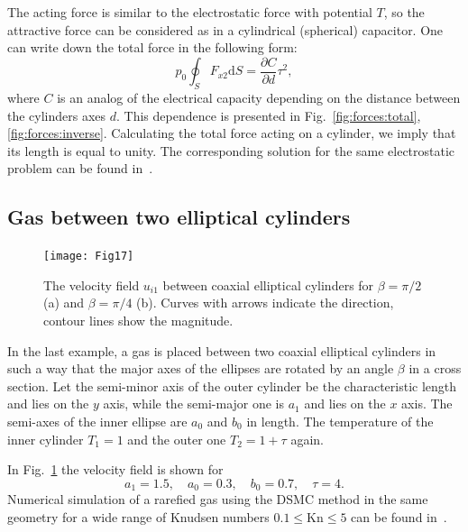 \documentclass[smallextended, referee]{svjour3} %
\newcommand{\Kn}{\mathrm{Kn}}
\newcommand{\dd}{\mathrm{d}}
\newcommand{\pder}[2][]{\frac{\partial#1}{\partial#2}}
\begin{document}
The acting force is similar to the electrostatic force with potential \(T\),
so the attractive force can be considered as in a cylindrical (spherical) capacitor.
One can write down the total force in the following form:
\begin{equation}
    p_0\oint_S F_{x2}\dd{S} = \pder[C]{d} \tau^2,
\end{equation}
where \(C\) is an analog of the electrical capacity depending on the distance between the cylinders axes \(d\).
This dependence is presented in Fig.~\ref{fig:forces:total}, \ref{fig:forces:inverse}.
Calculating the total force acting on a cylinder, we imply that its length is equal to unity.
The corresponding solution for the same electrostatic problem can be found in~\cite{Smythe1968Electricity}.

\subsection{Gas between two elliptical cylinders}

\begin{figure}
    \centering
    \texttt{[image: Fig17]}
    \caption{The velocity field \(u_{i1}\) between coaxial elliptical cylinders
            for \(\beta = \pi/2\) (a) and \(\beta = \pi/4\) (b).
        Curves with arrows indicate the direction, contour lines show the magnitude.}
    \label{fig:elliptic}
\end{figure}

In the last example, a gas is placed between two coaxial elliptical cylinders
in such a way that the major axes of the ellipses are rotated by an angle \(\beta\) in a cross section.
Let the semi-minor axis of the outer cylinder be the characteristic length and lies on the \(y\) axis,
while the semi-major one is \(a_1\) and lies on the \(x\) axis.
The semi-axes of the inner ellipse are \(a_0\) and \(b_0\) in length.
The temperature of the inner cylinder \(T_1 = 1\) and the outer one \(T_2 = 1+\tau\) again.

In Fig.~\ref{fig:elliptic} the velocity field is shown for
\[ a_1 = 1.5, \quad a_0 = 0.3, \quad b_0 = 0.7, \quad \tau = 4. \]
Numerical simulation of a rarefied gas using the DSMC method in the same geometry
for a wide range of Knudsen numbers \(0.1\le\Kn\le5\) can be found in~\cite{SoneCoaxial}.
\end{document}
